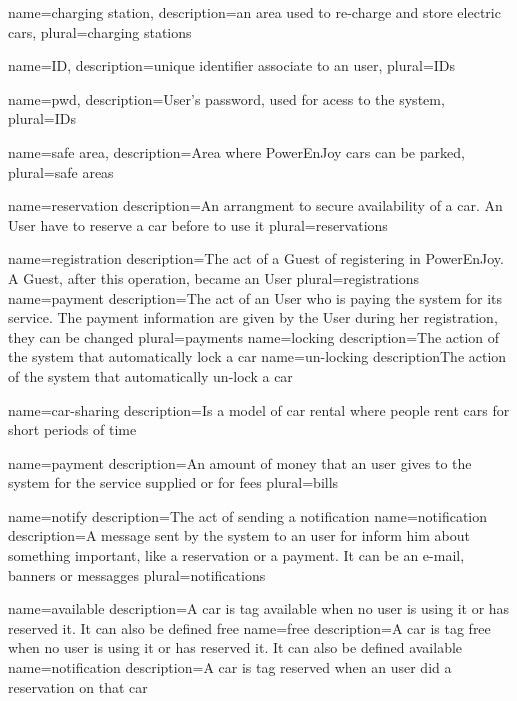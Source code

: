 {
  name={charging station},
  description={an area used to re-charge and store electric cars},
  plural={charging stations}
}

{
  name={ID},
  description={unique identifier associate to an user},
  plural={IDs}
}

{
  name={pwd},
  description={User's password, used for acess to the system},
  plural={IDs}
}

{
  name={safe area},
  description={Area where PowerEnJoy cars can be parked},
  plural={safe areas}
}

{
	name={reservation}
	description={An arrangment to secure availability of a car. An User have to reserve a car before to use it}
	plural={reservations}
}

{
	name={registration}
	description={The act of a Guest of registering in PowerEnJoy. A Guest, after this operation, became an User}
	plural={registrations}
}
{
	name={payment}
	description={The act of an User who is paying the system for its service. The payment information are given by the User during her \gls{registration}, they can be changed}
	plural={payments}
}
{
	name={locking}
	description={The action of the system that automatically lock a car}
}
{
	name={un-locking}
	description{The action of the system that automatically un-lock a car}
}

{
	name={car-sharing}
	description={Is a model of car rental where people rent cars for short periods of time}
}

{
	name={payment}
	description={An amount of money that an user gives to the system for the service supplied or for fees}
	plural={bills}
}

{
	name={notify}
	description={The act of sending a notification}
}
{
	name={notification}
	description={A message sent by the system to an user for inform him about something important, like a reservation or a payment. It can be an e-mail, banners or messagges}
	plural={notifications}
}

{
	name={available}
	description={A car is tag available when no user is using it or has reserved it. It can also be defined free}
}
{
	name={free}
	description={A car is tag free when no user is using it or has reserved it. It can also be defined available}
}
{
	name={notification}
	description={A car is tag reserved when an user did a reservation on that car}
}

